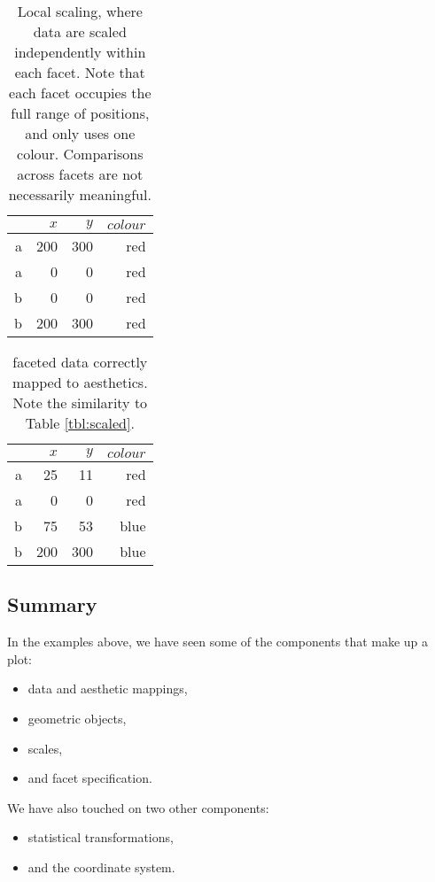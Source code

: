 \begin{table}[ht]
	\centering
	\begin{tabular}{r|r|r|r}
		& $x$ & $y$ & $colour$\\
		\hline
		a & 200 & 300 & red\\
		a & 0 & 0 & red\\
		\hline \hline
		b & 0 & 0 & red\\
		b & 200 & 300 & red
	\end{tabular}

	\caption{Local scaling, where data are scaled independently within each facet. Note that each facet occupies the full range of positions, and only uses one colour.  Comparisons across facets are not necessarily meaningful.}
	\label{tbl:complex-incorrect}
\end{table}

\begin{table}[ht]
	\centering
	\begin{tabular}{r|r|r|r}
		& $x$ & $y$ & $colour$\\
		\hline
		a & 25 & 11 & red\\
		a & 0 & 0 & red\\
		\hline \hline
		b & 75 & 53 & blue\\
		b & 200 & 300 & blue
	\end{tabular}

	\caption{faceted data correctly mapped to aesthetics.  Note the similarity to Table \ref{tbl:scaled}.}
	\label{tbl:complex-mapping}
\end{table}

\subsection{Summary}\label{sec:the_grammar}

In the examples above, we have seen some of the components that make up a plot:

\begin{itemize}
  \item data and aesthetic mappings,
  \item geometric objects, 
  \item scales,
  \item and facet specification.
\end{itemize}

\noindent We have also touched on two other components: 

\begin{itemize}
  \item statistical transformations,
  \item and the coordinate system.
\end{itemize}

